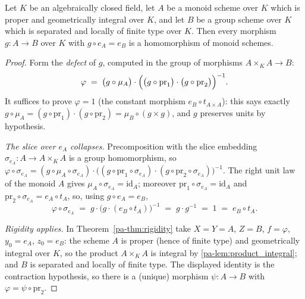 \begin{corollary}
  \label{pa-cor:pointed_hom}
  \leanok


  Let \(K\) be an algebraically closed field, let \(A\) be a monoid scheme over \(K\) which
  is proper and geometrically integral over \(K\), and let \(B\) be a group scheme over
  \(K\) which is separated and locally of finite type over \(K\). Then every morphism
  \(g : A \to B\) over \(K\) with \(g \circ e_A = e_B\) is a homomorphism of monoid schemes.
\end{corollary}
\begin{proof}
  \leanok
  Form the \emph{defect} of \(g\), computed in the group of morphisms
  \(A \times_K A \to B\):
  \[
    \varphi \;=\; \bigl(g \circ \mu_A\bigr) \cdot
      \Bigl(\bigl(g \circ \mathrm{pr}_1\bigr) \cdot \bigl(g \circ \mathrm{pr}_2\bigr)\Bigr)^{-1}.
  \]
  It suffices to prove \(\varphi = 1\) (the constant morphism \(e_B \circ t_{A \times A}\)):
  this says exactly \(g \circ \mu_A = (g \circ \mathrm{pr}_1) \cdot (g \circ \mathrm{pr}_2)
  = \mu_B \circ (g \times g)\), and \(g\) preserves units by hypothesis.

  \emph{The slice over \(e_A\) collapses.} Precomposition with the slice embedding
  \(\sigma_{e_A} : A \to A \times_K A\) is a group homomorphism, so
  \(\varphi \circ \sigma_{e_A} = (g \circ \mu_A \circ \sigma_{e_A}) \cdot
  \bigl((g \circ \mathrm{pr}_1 \circ \sigma_{e_A}) \cdot
  (g \circ \mathrm{pr}_2 \circ \sigma_{e_A})\bigr)^{-1}\). The right unit law of the monoid
  \(A\) gives \(\mu_A \circ \sigma_{e_A} = \mathrm{id}_A\); moreover
  \(\mathrm{pr}_1 \circ \sigma_{e_A} = \mathrm{id}_A\) and
  \(\mathrm{pr}_2 \circ \sigma_{e_A} = e_A \circ t_A\), so, using
  \(g \circ e_A = e_B\),
  \[
    \varphi \circ \sigma_{e_A}
      \;=\; g \cdot \bigl(g \cdot (e_B \circ t_A)\bigr)^{-1}
      \;=\; g \cdot g^{-1}
      \;=\; 1
      \;=\; e_B \circ t_A .
  \]

  \emph{Rigidity applies.} In Theorem~\ref{pa-thm:rigidity} take \(X = Y = A\), \(Z = B\),
  \(f = \varphi\), \(y_0 = e_A\), \(z_0 = e_B\): the scheme \(A\) is proper (hence of finite
  type) and geometrically integral over \(K\), so the product \(A \times_K A\) is integral by
  \ref{pa-lem:product_integral}; and \(B\) is separated and locally of finite type. The
  displayed identity is the contraction hypothesis, so there is a (unique) morphism
  \(\psi : A \to B\) with \(\varphi = \psi \circ \mathrm{pr}_2\).


\end{proof}

